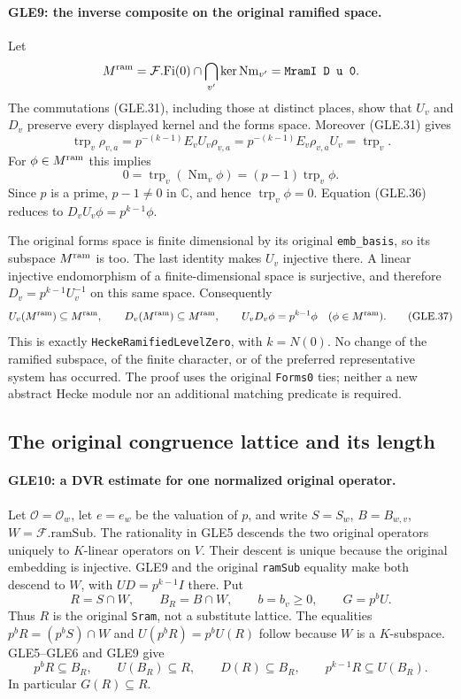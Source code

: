 \paragraph{GLE9: the inverse composite on the original ramified space.}
\label{claim:GLE9}
Let
\[
 M^{\rm ram}=\mathcal F.\mathrm{Fi}(0)\cap
                  \bigcap_{v'}\ker\operatorname{Nm}_{v'}
                    =\texttt{MramI D u 0}.
\]
The commutations (GLE.31), including those at distinct places,
show that $U_v$ and $D_v$ preserve every displayed kernel and the
forms space.  Moreover (GLE.31) gives
\[
 \operatorname{trp}_v\rho_{v,a}
       =p^{-(k-1)}E_vU_v\rho_{v,a}
       =p^{-(k-1)}E_v\rho_{v,a}U_v
       =\operatorname{trp}_v.
\]
For $\phi\in M^{\rm ram}$ this implies
\[
 0=\operatorname{trp}_v(\operatorname{Nm}_v\phi)
                 =(p-1)\operatorname{trp}_v\phi.
\]
Since $p$ is a prime, $p-1\ne0$ in $\mathbb C$, and hence
$\operatorname{trp}_v\phi=0$.  Equation (GLE.36) reduces to
$D_vU_v\phi=p^{k-1}\phi$.

The original forms space is finite dimensional by its original
\texttt{emb\_basis}, so its subspace $M^{\rm ram}$ is too.
The last identity makes $U_v$ injective there.  A linear injective
endomorphism of a finite-dimensional space is surjective, and
therefore $D_v=p^{k-1}U_v^{-1}$ on this same space.  Consequently
\[
 U_v(M^{\rm ram})\subseteq M^{\rm ram},\qquad
 D_v(M^{\rm ram})\subseteq M^{\rm ram},\qquad
 U_vD_v\phi=p^{k-1}\phi\quad(\phi\in M^{\rm ram}).             \tag{GLE.37}
\]
This is exactly \texttt{HeckeRamifiedLevelZero}, with $k=N(0)$.
No change of the ramified subspace, of the finite character, or of
the preferred representative system has occurred.  The proof uses
the original \texttt{Forms0} ties; neither a new abstract Hecke
module nor an additional matching predicate is required.

\subsection{The original congruence lattice and its length}

\paragraph{GLE10: a DVR estimate for one normalized original operator.}
\label{claim:GLE10}
Let $\mathcal O=\mathcal O_w$, let $e=e_w$ be the valuation of $p$,
and write $S=S_w$, $B=B_{w,v}$, $W=\mathcal F.\mathrm{ramSub}$.
The rationality in GLE5 descends the two original operators uniquely
to $K$-linear operators on $V$.  Their descent is unique because
the original embedding is injective.  GLE9 and the original
\texttt{ramSub} equality make both descend to $W$, with
$UD=p^{k-1}I$ there.  Put
\[
 R=S\cap W,\qquad B_R=B\cap W,\qquad b=b_v\ge0,
 \qquad G=p^bU.
\]
Thus $R$ is the original \texttt{Sram}, not a substitute lattice.
The equalities $p^bR=(p^bS)\cap W$ and
$U(p^bR)=p^bU(R)$ follow because $W$ is a $K$-subspace.
GLE5--GLE6 and GLE9 give
\[
 p^bR\subseteq B_R,\qquad U(B_R)\subseteq R,\qquad
 D(R)\subseteq B_R,\qquad
 p^{k-1}R\subseteq U(B_R).
\]
In particular $G(R)\subseteq R$.


